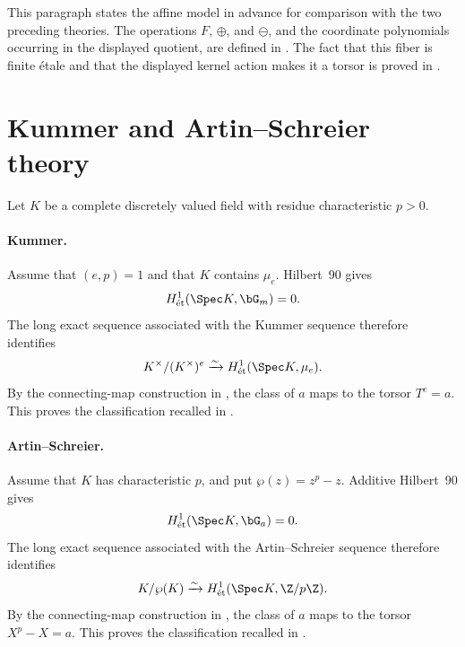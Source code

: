 This paragraph states the affine model in advance for comparison with the
two preceding theories. The operations $F$, $\oplus$, and $\ominus$, and the
coordinate polynomials occurring in the displayed quotient, are defined in
. The fact that this fiber is
finite \'etale and that the displayed kernel action makes it a torsor is
proved in .

\section{Kummer and Artin--Schreier theory}
\label{appendix:kummer_and_as_proofs}

Let $K$ be a complete discretely valued field with residue characteristic
$p>0$.

\paragraph{Kummer.}

Assume that $(e,p)=1$ and that $K$ contains $\mu_e$. Hilbert~90 gives
\[
H^1_{\mathrm{\acute et}}(\Spec K,\bG_m)=0.
\]
The long exact sequence associated with the Kummer sequence therefore
identifies
\[
K^\times/(K^\times)^e
\xrightarrow{\sim}
H^1_{\mathrm{\acute et}}(\Spec K,\mu_e).
\]
By the connecting-map construction in
, the class of $a$ maps to
the torsor $T^e=a$. This proves the classification recalled in
.

\paragraph{Artin--Schreier.}

Assume that $K$ has characteristic $p$, and put $\wp(z)=z^p-z$.
Additive Hilbert~90 gives
\[
H^1_{\mathrm{\acute et}}(\Spec K,\bG_a)=0.
\]
The long exact sequence associated with the Artin--Schreier sequence therefore
identifies
\[
K/\wp(K)
\xrightarrow{\sim}
H^1_{\mathrm{\acute et}}(\Spec K,\Z/p\Z).
\]
By the connecting-map construction in
, the class of $a$ maps to
the torsor $X^p-X=a$. This proves the classification recalled in
.

